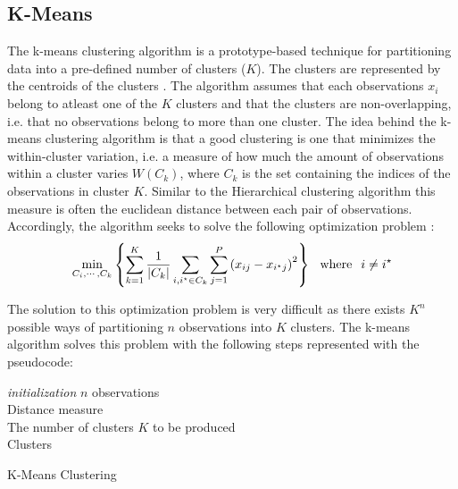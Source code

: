 \documentclass[../thesis.tex]{subfiles}
\begin{document}
\vspace*{-0,25cm}\subsection{K-Means}
\label{subsec:K-Means}

\noindent The k-means clustering algorithm \citep{forgy1965cluster} is a prototype-based technique for partitioning data into a pre-defined number of clusters ($K$). The clusters are represented by the centroids of the clusters \citep{tan2007introduction}. The algorithm assumes that each observations $x_i$ belong to atleast one of the $K$ clusters and that the clusters are non-overlapping, i.e. that no observations belong to more than one cluster. The idea behind the k-means clustering algorithm is that a good clustering is one that minimizes the within-cluster variation, i.e. a measure of how much the amount of observations within a cluster varies $W(C_k)$, where $C_k$ is the set containing the indices of the observations in cluster $K$. Similar to the Hierarchical clustering algorithm this measure is often the euclidean distance between each pair of observations. Accordingly, the algorithm seeks to solve the following optimization problem \citep{james2013introduction}:
\begin{align}
    \min_{C_i, \cdots, C_k} \left\{\sum_{k=1}^K \frac{1}{|C_k|} \sum_{i,i^\star \in C_k}\sum_{j=1}^P\left(x_{ij} - x_{i^\star j} \right)^2 \right\}\hspace*{0,25cm}\text{where}\hspace*{0,25cm} i \neq i^\star
\end{align}

\noindent The solution to this optimization problem is very difficult as there exists $K^n$ possible ways of partitioning $n$ observations into $K$ clusters. The k-means algorithm solves this problem with the following steps represented with the pseudocode:\\

\begin{algorithm}[H]{
\SetAlgoLined
\textit{initialization}\;
    \hspace*{0,5cm}$n$ observations\\
    \hspace*{0,5cm}Distance measure\\
    \hspace*{0,5cm}The number of clusters $K$ to be produced\\
    \Return Clusters
}
\caption{K-Means Clustering}
\end{algorithm}
\end{document}
